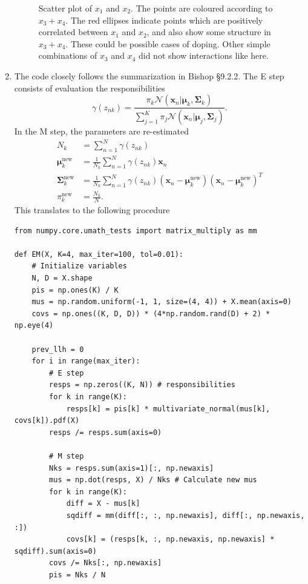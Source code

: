 \documentclass[a4paper]{article}
\begin{document}
\begin{enumerate}
\begin{figure}[H]
\caption{Scatter plot of $x_1$ and $x_2$. The points are coloured according to $x_3 + x_4$. The red ellipses indicate points which are positively correlated between $x_1$ and $x_2$, and also show some structure in $x_3 + x_4$. These could be possible cases of doping. Other simple combinations of $x_3$ and $x_4$ did not show interactions like here.}
\label{fig:scatter}
\end{figure}
\item 
The code closely follows the summarization in Bishop \S9.2.2. The E step consists of evaluation the responsibilities
\begin{equation}
\gamma(z_{nk}) = \frac{\pi_k\mathcal{N}(\bm{x}_n|\bm{\mu}_k,\bm{\Sigma}_k)}{\sum_{j=1}^K\pi_j\mathcal{N}(\bm{x}_n|\bm{\mu}_j,\bm{\Sigma}_j)}.
\end{equation}
In the M step, the parameters are re-estimated
\begin{align}
N_k &= \sum_{n=1}^N\gamma(z_{nk}) \\
\bm{\mu}_k^{\text{new}}&=\frac{1}{N_k}\sum_{n=1}^N\gamma(z_{nk})\bm{x}_n\\
\bm{\Sigma}_k^{\text{new}} &= \frac{1}{N_k}\sum_{n=1}^N\gamma(z_{nk})(\bm{x}_n - \bm{\mu}_k^{\text{new}})(\bm{x}_n - \bm{\mu}_k^{\text{new}})^T \\
\pi_k^{\text{new}} &= \frac{N_k}{N}.
\end{align}
This translates to the following procedure
\begin{lstlisting}
from numpy.core.umath_tests import matrix_multiply as mm

def EM(X, K=4, max_iter=100, tol=0.01):
    # Initialize variables
    N, D = X.shape
    pis = np.ones(K) / K
    mus = np.random.uniform(-1, 1, size=(4, 4)) + X.mean(axis=0)
    covs = np.ones((K, D, D)) * (4*np.random.rand(D) + 2) * np.eye(4)
    
    prev_llh = 0
    for i in range(max_iter):
        # E step
        resps = np.zeros((K, N)) # responsibilities
        for k in range(K):
            resps[k] = pis[k] * multivariate_normal(mus[k], covs[k]).pdf(X)
        resps /= resps.sum(axis=0)
        
        # M step
        Nks = resps.sum(axis=1)[:, np.newaxis]
        mus = np.dot(resps, X) / Nks # Calculate new mus
        for k in range(K):
            diff = X - mus[k]
            sqdiff = mm(diff[:, :, np.newaxis], diff[:, np.newaxis, :])
            covs[k] = (resps[k, :, np.newaxis, np.newaxis] * sqdiff).sum(axis=0)
        covs /= Nks[:, np.newaxis]
        pis = Nks / N
        

\end{lstlisting}
\end{enumerate}
\end{document}

